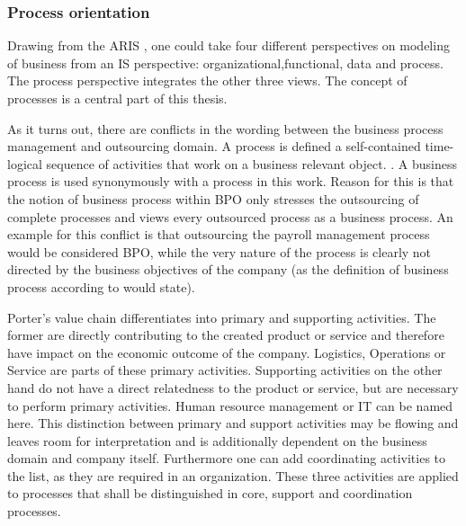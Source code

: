 		\subsubsection{Process orientation}
		\label{processorientation}
	Drawing from the  \acrfull{ARIS} \citep{Scheer1997}, one could take four different perspectives on modeling of business from an \acrshort{IS} perspective: organizational,functional, data and process. The process perspective integrates the other three views. The concept of processes is a central part of this thesis. 

	As it turns out, there are conflicts in the wording between the business process management and outsourcing domain. A process is defined a self-contained time-logical sequence of activities that work on a business relevant object. \citep[]{becker2012pm}. 
	A business process is used synonymously with a process in this work. Reason for this is that the notion of business process within BPO only stresses the outsourcing of complete processes and views every outsourced process as a business process.  An example for this conflict is that outsourcing the payroll management process would be considered \acrshort{BPO}, while the very nature of the process is clearly not directed by the business objectives of the company (as the definition of business process according to \citep[]{becker2012pm} would state). 
	
	Porter's value chain differentiates into primary and supporting activities. The former are directly contributing to the created product or service and therefore have impact on the economic outcome of the company. Logistics, Operations or Service are parts of these primary activities. Supporting activities on the other hand do not have a direct relatedness to the product or service, but are necessary to perform primary activities. Human resource management or IT can be named here. This distinction between primary and support activities may be flowing and leaves room for interpretation and is additionally dependent on the business domain and company itself. Furthermore one can add coordinating activities to the list, as they are required in an organization. These three activities are applied to processes that shall be distinguished in core, support and coordination processes. 
	 
